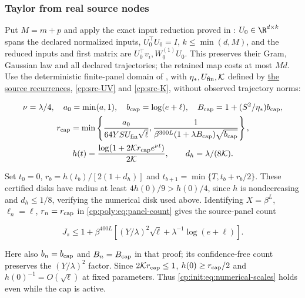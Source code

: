 \subsubsection{Taylor from real source nodes}
\label{cp:init:sec:taylor}

Put $M=m+p$ and apply the exact input reduction proved in :
$U_0\in\R^{d\times k}$ spans the declared normalized inputs,
$U_0^\top U_0=I$, $k\le\min(d,M)$, and the reduced inputs and
first matrix are $U_0^\top v_i,W_0^{(1)}U_0$. This preserves
their Gram, Gaussian law and all declared trajectories; the retained
map costs at most $Md$.
Use the deterministic finite-panel domain of , with
$\eta_*,U_{\rm fin},\mathcal K$ defined by
\hyperref[cp:src-coefficients]{the source recurrences}, \eqref{cp:src-UV}
and \eqref{cp:src-K}, without observed trajectory norms:

\begin{equation}
\label{cp:init:eq:capped-panels}
\begin{gathered}
\nu=\lambda/4,\quad a_0=\min(a,1),\quad
b_{\rm cap}=\log(e+\ell),\quad B_{\rm cap}=1+(S^2/\eta_*)b_{\rm cap},\\
r_{\rm cap}=\min\left\{\frac{a_0}{64YSU_{\rm fin}\sqrt\ell},
 \frac1{\beta^{300L}(1+\lambda B_{\rm cap})\sqrt{b_{\rm cap}}}\right\},\\
h(t)=\frac{\log(1+2\mathcal K r_{\rm cap}e^{\nu t})}{2\mathcal K},
\qquad d_h=\lambda/(8\mathcal K).
\end{gathered}
\end{equation}

Set $t_0=0$, $r_b=h(t_b)/[2(1+d_h)]$ and
$t_{b+1}=\min\{T,t_b+r_b/2\}$. These certified disks have radius
at least $4h(0)/9>h(0)/4$, since $h$ is nondecreasing and
$d_h\le1/8$, verifying the numerical disk used above. Identifying
$X=\beta^L$, $\ell_n=\ell$, $r_n=r_{\rm cap}$ in
\eqref{cp:poly:eq:panel-count} gives the source-panel count

\begin{equation}
\label{cp:init:eq:taylor-panels}
J_s\le1+\beta^{400L}\left[(Y/\lambda)^2\sqrt\ell
                  +\lambda^{-1}\log(e+\ell)\right].
\end{equation}

Here also $b_n=b_{\rm cap}$ and $B_n=B_{\rm cap}$ in that proof;
its confidence-free count preserves the $(Y/\lambda)^2$ factor.
Since $2\mathcal K r_{\rm cap}\le1$, $h(0)\ge r_{\rm cap}/2$
and $h(0)^{-1}=O(\sqrt\ell)$ at fixed parameters. Thus
\eqref{cp:init:eq:numerical-scales} holds even while the cap is active.


